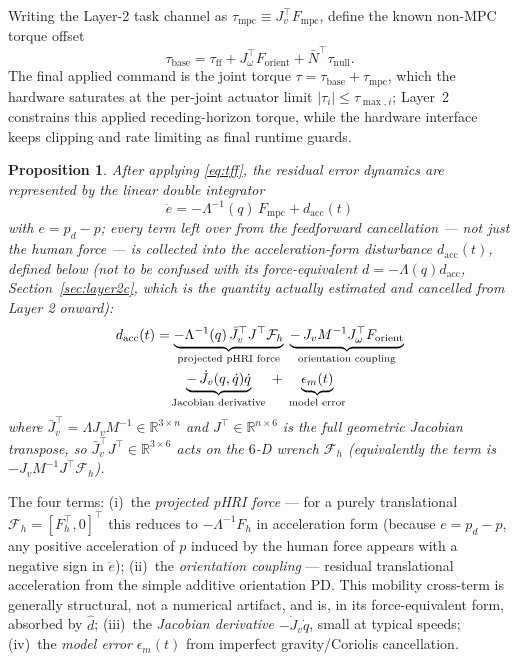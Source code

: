 \documentclass[journal]{IEEEtran}
\newtheorem{proposition}{Proposition}
\newcommand{\Laminv}{\Lambda^{-1}(q)}
\newcommand{\Fmpc}{F_{\text{mpc}}}
\newcommand{\dhat}{\hat{d}}
\newcommand{\Nbar}{\bar{N}}
\begin{document}
Writing the Layer-2 task channel as $\tau_{\text{mpc}}\equiv J_v^\top\Fmpc$,
define the known non-MPC torque offset
\[
  \tau_{\text{base}}=
  \tau_{\text{ff}}+J_\omega^\top F_{\text{orient}}+\Nbar^\top\tau_{\text{null}}.
\]
The final applied command is the joint torque
$\tau = \tau_{\text{base}}+\tau_{\text{mpc}}$, which the hardware saturates at
the per-joint actuator limit $|\tau_i|\leq\tau_{\max,i}$; Layer~2 constrains
this applied receding-horizon torque, while the hardware interface keeps
clipping and rate limiting as final runtime guards.

\begin{proposition}\label{prop:doubleint}
After applying \eqref{eq:tff}, the residual error dynamics are represented by
the linear double integrator
\begin{equation}\label{eq:errordyn}
  \ddot{e} = -\Laminv\,\Fmpc + d_{\text{acc}}(t)
\end{equation}
with $e=p_d-p$; every term left over from the feedforward cancellation ---
not just the human force --- is collected into the \emph{acceleration}-form
disturbance $d_{\text{acc}}(t)$, defined below (not to be confused with its
force-equivalent $d=-\Lambda(q)d_{\text{acc}}$, Section~\ref{sec:layer2c},
which is the quantity actually estimated and cancelled from Layer 2
onward):
\begin{align}\label{eq:dist}
  d_{\text{acc}}(t) &= \underbrace{-\Laminv\,\bar{J}_v^\top J^\top\mathcal{F}_h}_{%
           \text{projected pHRI force}}
          \;\underbrace{-\,J_vM^{-1}J_\omega^\top F_{\text{orient}}}_{%
           \text{orientation coupling}}\notag\\
        &\quad\underbrace{-\,\dot{J}_v(q,\dot{q})\dot{q}}_{%
           \text{Jacobian derivative}}
          \;+\;\underbrace{\epsilon_m(t)}_{\text{model error}}
\end{align}
where $\bar{J}_v^\top=\Lambda J_vM^{-1}\in\mathbb{R}^{3\times n}$ and
$J^\top\in\mathbb{R}^{n\times 6}$ is the full geometric Jacobian transpose,
so $\bar{J}_v^\top J^\top\in\mathbb{R}^{3\times 6}$ acts on the $6$-D wrench
$\mathcal{F}_h$ (equivalently the term is $-J_vM^{-1}J^\top\mathcal{F}_h$).
\end{proposition}

The four terms: (i)~the \emph{projected pHRI force} — for a purely
translational $\mathcal{F}_h=[F_h^\top,0]^\top$ this reduces to
$-\Lambda^{-1}F_h$ in acceleration form (because $e=p_d-p$, any positive
acceleration of $p$ induced by the human force appears with a negative sign
in $\ddot e$);
(ii)~the \emph{orientation coupling} — residual translational
acceleration from the simple additive orientation PD. This mobility
cross-term is generally structural, not a numerical artifact, and is,
in its force-equivalent form, absorbed by $\dhat$;
(iii)~the \emph{Jacobian derivative} $-\dot{J}_v\dot{q}$, small at
typical speeds; (iv)~the \emph{model error} $\epsilon_m(t)$ from
imperfect gravity/Coriolis cancellation.
\end{document}
